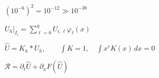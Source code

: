 \documentclass{article}
\begin{document}
\begin{preview}
\hbox{
\color[HTML]{242424}\fontsize{27}{32.4}\selectfont
$\displaystyle (10^{-6})^2=10^{-12}\gg 10^{-38}$
}
\end{preview}
\begin{preview}
\hbox{
\color[HTML]{242424}\fontsize{27}{32.4}\selectfont
$\displaystyle U_h|_{I_i}=\sum_{\ell=0}^{q}U_{i,\ell}\varphi_\ell(x)$
}
\end{preview}
\begin{preview}
\hbox{
\color[HTML]{242424}\fontsize{24}{28.799999999999997}\selectfont
$\displaystyle \widehat U=K_h*U_h,\qquad\int K=1,\quad\int x^rK(x)\,dx=0$
}
\end{preview}
\begin{preview}
\hbox{
\color[HTML]{242424}\fontsize{28}{33.6}\selectfont
$\displaystyle \mathscr R=\partial_t\widehat U+\partial_xF(\widehat U)$
}
\end{preview}
\end{document}
